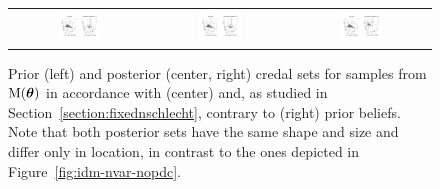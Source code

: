 \begin{figure}
\begin{tabular}{ccc}%
\hspace*{-1.2ex}%
\includegraphics[trim =  20mm 25mm 150mm 20mm, clip, width=0.33\textwidth]{fig/jstp-paper_idm_nfest_01-080331}%
\hspace*{-1.2ex}%
&%
\hspace*{-1.2ex}%
\includegraphics[trim = 150mm 25mm  20mm 20mm, clip, width=0.33\textwidth]{fig/jstp-paper_idm_nfest_01-080331}%
\hspace*{-1.2ex}%
&%
\hspace*{-1.2ex}%
\includegraphics[trim = 150mm 25mm  20mm 20mm, clip, width=0.33\textwidth]{fig/jstp-paper_idm_nfest_02-080331}%
\hspace*{-1.2ex}%
\end{tabular}%
\caption[\ymodel\ for samples from $\mult(\btheta)$: prior and posterior credal sets
for data in accordance with and contrary to prior beliefs.]%
{Prior (left) and posterior (center, right) credal sets for samples from
$\mult(\btheta)$ in accordance with (center) and, as studied in
Section~\ref{section:fixednschlecht}, contrary to (right) prior
beliefs. Note that both posterior sets have the same shape and size and differ
only in location, in contrast to the ones depicted in Figure~\ref{fig:idm-nvar-nopdc}.}
\label{fig:idm-nfest-nopdc}
\end{figure}


